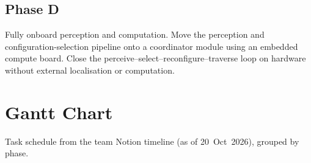 \documentclass[12pt,a4paper]{article}
\begin{document}
\subsection{Phase D}
Fully onboard perception and computation. Move the perception and
configuration-selection pipeline onto a coordinator module using an embedded
compute board. Close the perceive--select--reconfigure--traverse loop on
hardware without external localisation or computation.

\clearpage
\section{Gantt Chart}
\label{sec:gantt}

Task schedule from the team Notion timeline (as of 20~Oct~2026), grouped by phase.
\end{document}
